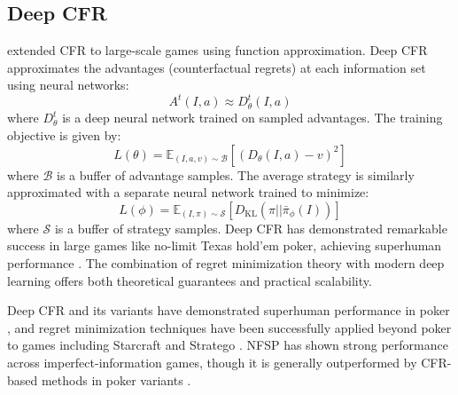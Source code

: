 \subsection{Deep CFR}

\citet{Brown2019} extended CFR to large-scale games using function approximation. Deep CFR approximates the advantages (counterfactual regrets) at each information set using neural networks:
\begin{equation}
A^t(I,a) \approx D^t_{\theta}(I,a)
\end{equation}
where $D^t_{\theta}$ is a deep neural network trained on sampled advantages. The training objective is given by:
\begin{equation}
L(\theta) = \mathbb{E}_{(I,a,v) \sim \mathcal{B}} [(D_{\theta}(I,a) - v)^2]
\end{equation}
where $\mathcal{B}$ is a buffer of advantage samples. The average strategy is similarly approximated with a separate neural network trained to minimize:
\begin{equation}
L(\phi) = \mathbb{E}_{(I,\pi) \sim \mathcal{S}} [D_{\text{KL}}(\pi || \bar{\pi}_{\phi}(I))]
\end{equation}
where $\mathcal{S}$ is a buffer of strategy samples. Deep CFR has demonstrated remarkable success in large games like no-limit Texas hold'em poker, achieving superhuman performance \citep{brown2019_deepcfr}. The combination of regret minimization theory with modern deep learning offers both theoretical guarantees and practical scalability.

Deep CFR and its variants have demonstrated superhuman performance in poker \citep{moravcik2017}, and regret minimization techniques have been successfully applied beyond poker to games including Starcraft and Stratego \citep{deepmind2022}. NFSP has shown strong performance across imperfect-information games, though it is generally outperformed by CFR-based methods in poker variants \citep{moravcik2017}.
